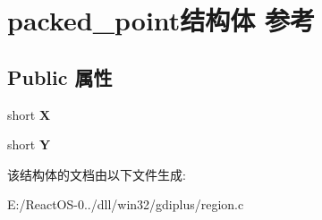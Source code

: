 \hypertarget{structpacked__point}{}\section{packed\+\_\+point结构体 参考}
\label{structpacked__point}
\subsection*{Public 属性}
\begin{DoxyCompactItemize}
\item 
\mbox{\label{structpacked__point_a69dda40dd7afbafb2b988a35e8e9c9b6}} 
short {\bfseries X}
\item 
\mbox{\label{structpacked__point_a6a9ae423795b01730545d92a74d5a8e2}} 
short {\bfseries Y}
\end{DoxyCompactItemize}


该结构体的文档由以下文件生成\+:\begin{DoxyCompactItemize}
\item 
E\+:/\+React\+O\+S-\/0../dll/win32/gdiplus/region.\+c\end{DoxyCompactItemize}

